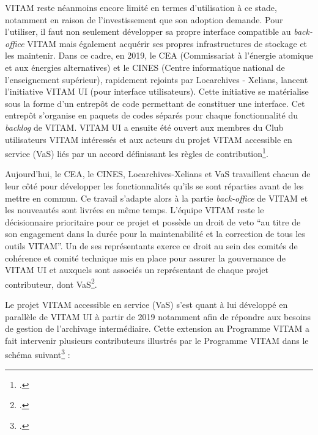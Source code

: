 \gls{VITAM} reste néanmoins encore limité en termes d’utilisation à ce stade, notamment en raison de l’investissement que son adoption demande. Pour l’utiliser, il faut non seulement développer sa propre interface compatible au \textit{\gls{back-office}} \gls{VITAM} mais également acquérir ses propres infrastructures de stockage et les maintenir. Dans ce cadre, en 2019, le CEA (Commissariat à l'énergie atomique et aux énergies alternatives) et le CINES (Centre informatique national de l'enseignement supérieur), rapidement rejoints par Locarchives - Xelians, lancent l’initiative VITAM UI (pour interface utilisateurs). Cette initiative se matérialise sous la forme d’un entrepôt de code permettant de constituer une interface. Cet entrepôt s’organise en paquets de codes séparés pour chaque fonctionnalité du \textit{backlog} de \gls{VITAM}. VITAM UI a ensuite été ouvert aux membres du Club utilisateurs \gls{VITAM} intéressés et aux acteurs du projet \gls{VITAM} accessible en service (VaS) liés par un accord définissant les règles de contribution\footcite{noauthor_vitam_nodate}.


Aujourd’hui, le CEA, le CINES, Locarchives-Xelians et VaS travaillent chacun de leur côté pour développer les fonctionnalités qu’ils se sont réparties avant de les mettre en commun. Ce travail s’adapte alors à la partie \textit{\gls{back-office}} de \gls{VITAM} et les nouveautés sont livrées en même temps. L’équipe \gls{VITAM} reste le décisionnaire prioritaire pour ce projet et possède un droit de veto \enquote{au titre de son engagement dans la durée pour la maintenabilité et la correction de tous les outils \gls{VITAM}}. Un de ses représentants exerce ce droit au sein des comités de cohérence et comité technique mis en place pour assurer la gouvernance de VITAM UI et auxquels sont associés un représentant de chaque projet contributeur, dont VaS\footcite{noauthor_vitam_nodate}.


Le projet VITAM accessible en service (VaS) s’est quant à lui développé en parallèle de VITAM UI à partir de 2019 notamment afin de répondre aux besoins de gestion de l’archivage intermédiaire. Cette extension au Programme \gls{VITAM} a fait intervenir plusieurs contributeurs illustrés par le Programme \gls{VITAM} dans le schéma suivant\footcite{noauthor_vitam_nodate-1} : 





